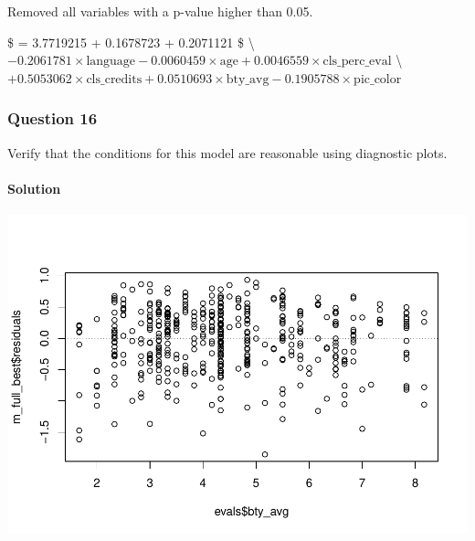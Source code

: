 \documentclass[]{article}
\newenvironment{Shaded}{\begin{snugshade}}{\end{snugshade}}
\newcommand{\KeywordTok}[1]{\textcolor[rgb]{0.13,0.29,0.53}{\textbf{#1}}}
\newcommand{\DataTypeTok}[1]{\textcolor[rgb]{0.13,0.29,0.53}{#1}}
\newcommand{\DecValTok}[1]{\textcolor[rgb]{0.00,0.00,0.81}{#1}}
\newcommand{\StringTok}[1]{\textcolor[rgb]{0.31,0.60,0.02}{#1}}
\newcommand{\OperatorTok}[1]{\textcolor[rgb]{0.81,0.36,0.00}{\textbf{#1}}}
\newcommand{\NormalTok}[1]{#1}
\let\oldparagraph\paragraph
\renewcommand{\paragraph}[1]{\oldparagraph{#1}\mbox{}}
\begin{document}
Removed all variables with a p-value higher than 0.05.

\$  = 3.7719215 + 0.1678723 \times {} +
0.2071121 \times {}\$ \textbackslash{}
\(-0.2061781 \times \text{language}-0.0060459 \times \text{age} + 0.0046559 \times \text{cls_perc_eval}\)
\textbackslash{}
\(+ 0.5053062 \times \text{cls_credits} + 0.0510693 \times \text{bty_avg} -0.1905788 \times \text{pic_color}\)

\subsubsection{Question 16}\label{question-16}

Verify that the conditions for this model are reasonable using
diagnostic plots.

\paragraph{Solution}\label{solution-15}

\begin{Shaded}
\end{Shaded}

\includegraphics{multiple_regression_files/figure-latex/quest-16-1.pdf}
\end{document}
